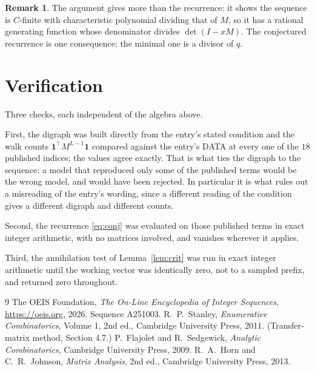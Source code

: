 \documentclass[11pt,a4paper]{article}
\theoremstyle{plain}
\theoremstyle{definition}
\newtheorem{remark}[theorem]{Remark}
\begin{document}
\begin{remark}
The argument gives more than the recurrence: it shows the sequence is $C$-finite with
characteristic polynomial dividing that of $M$, so it has a rational generating function
whose denominator divides $\det(I-xM)$. The conjectured recurrence is one consequence; the
minimal one is a divisor of $q$.
\end{remark}

\section{Verification}

Three checks, each independent of the algebra above.

First, the digraph was built directly from the entry's stated condition and the walk counts
$\mathbf{1}^{\!\top}M^{L-1}\mathbf{1}$ compared against the entry's DATA at
every one of the $18$ published indices; the values agree exactly. That is what ties
the digraph to the sequence: a model that reproduced only some of the published terms would
be the wrong model, and would have been rejected. In particular it is what rules out a
misreading of the entry's wording, since a different reading of the condition gives a
different digraph and different counts.

Second, the recurrence \eqref{eq:conj} was evaluated on those published terms in exact
integer arithmetic, with no matrices involved, and vanishes wherever it applies.

Third, the annihilation test of Lemma~\ref{lem:crit} was run in exact integer arithmetic
until the working vector was identically zero, not to a sampled prefix, and returned zero
throughout.

\begin{thebibliography}{9}
 The OEIS Foundation, \emph{The On-Line Encyclopedia of Integer
Sequences}, \url{https://oeis.org}, 2026. Sequence A251003.
 R.~P.~Stanley, \emph{Enumerative Combinatorics}, Volume 1, 2nd ed.,
Cambridge University Press, 2011. (Transfer-matrix method, Section 4.7.)
 P.~Flajolet and R.~Sedgewick, \emph{Analytic Combinatorics}, Cambridge
University Press, 2009.
 R.~A.~Horn and C.~R.~Johnson, \emph{Matrix Analysis}, 2nd ed., Cambridge
University Press, 2013.
\end{thebibliography}
\end{document}
